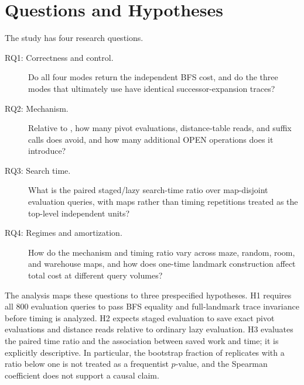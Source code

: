 \section{Questions and Hypotheses}
\label{sec:questions}

The study has four research questions.

\begin{description}
  \item[RQ1: Correctness and control.] Do all four modes return the independent
  BFS cost, and do the three modes that ultimately use \HFull{} have identical
  successor-expansion traces?

  \item[RQ2: Mechanism.] Relative to \LazyFull{}, how many pivot evaluations,
  distance-table reads, and suffix calls does \Staged{} avoid, and how many
  additional OPEN operations does it introduce?

  \item[RQ3: Search time.] What is the paired staged/lazy search-time ratio
  over map-disjoint evaluation queries, with maps rather than timing
  repetitions treated as the top-level independent units?

  \item[RQ4: Regimes and amortization.] How do the mechanism and timing ratio
  vary across maze, random, room, and warehouse maps, and how does one-time
  landmark construction affect total cost at different query volumes?
\end{description}

The analysis maps these questions to three prespecified hypotheses.  H1
requires all 800 evaluation queries to pass BFS equality and
full-landmark trace invariance before timing is analyzed.  H2 expects staged
evaluation to save exact pivot evaluations and distance reads relative to
ordinary lazy evaluation.  H3 evaluates the paired time ratio and the
association between saved work and time; it is explicitly descriptive.  In
particular, the bootstrap fraction of replicates with a ratio below one is
not treated as a frequentist $p$-value, and the Spearman coefficient does not
support a causal claim.
